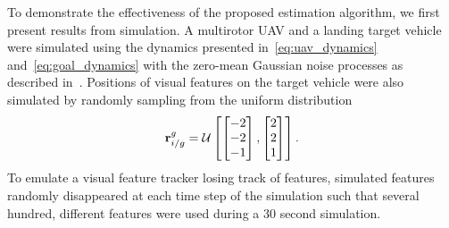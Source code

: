 
To demonstrate the effectiveness of the proposed estimation algorithm, we first
present results from simulation.
A multirotor UAV and a landing target vehicle were simulated using the dynamics presented
in~\eqref{eq:uav_dynamics} and~\eqref{eq:goal_dynamics} with the zero-mean
Gaussian noise processes as described
in~.
Positions of visual features on the target vehicle
were also simulated by randomly sampling from the uniform distribution
\begin{equation}
  \boldsymbol{\mathrm{r}}_{i/g}^g = \mathcal{U}
  \left[ \begin{bmatrix} -2 \\ -2 \\ -1 \end{bmatrix},
  \begin{bmatrix} 2 \\ 2 \\ 1 \end{bmatrix} \right].
  \label{eq:uniform_dist}
\end{equation}
To emulate a visual feature tracker losing track of features, simulated features
randomly disappeared at each time step of the simulation
such that several
hundred, different features were used during a 30 second simulation.


